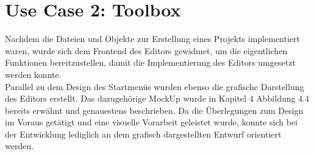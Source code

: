 \section{Use Case 2: Toolbox}
Nachdem die Dateien und Objekte zur Erstellung eines Projekts implementiert waren, wurde sich dem Frontend des Editors gewidmet, um die eigentlichen
Funktionen bereitzustellen, damit die Implementierung des Editors umgesetzt werden konnte. 
\\Parallel zu dem Design des Startmenüs wurden ebenso die grafische Darstellung 
des Editors erstellt. Das dazugehörige MockUp wurde in Kapitel 4 Abbildung 4.4 bereits erwähnt und genauestens beschrieben. 
Da die Überlegungen zum Design im Voraus getätigt und eine visuelle Vorarbeit geleistet wurde, konnte sich bei der Entwicklung lediglich an dem 
grafisch dargestellten Entwurf orientiert werden.
